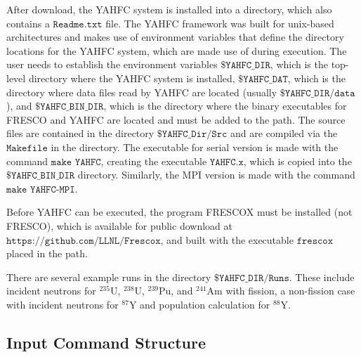 \documentclass[
10pt,
showpacs,preprintnumbers,footinbib,
amsfonts,amsmath,amssymb,
aps,
prc,twocolumn,groupedaddress,superscriptaddress,
showkeys,
nofootinbib
]{revtex4-1}
\begin{document}
After download, the YAHFC system is installed into a directory, which also contains a ${\texttt{Readme.txt}}$ file.
The YAHFC framework was built for unix-based architectures and makes use of environment variables that define the directory locations for the YAHFC system, which are made use of during execution. The user needs to establish the environment variables ${\texttt{\$YAHFC\_DIR}}$, which is the top-level directory where the YAHFC system is installed, ${\texttt{\$YAHFC\_DAT}}$, which is the directory where data files read by YAHFC are located (usually ${\texttt{\$YAHFC\_DIR/data}}$), and ${\texttt{\$YAHFC\_BIN\_DIR}}$, which is the directory where the binary executables for FRESCO and YAHFC are located and must be added to the path. The source files are contained in the directory ${\texttt{\$YAHFC\_Dir/Src}}$ and are compiled via the ${\texttt{Makefile}}$ in the directory. The executable for serial version is made with the command ${\texttt{make YAHFC}}$, creating the executable ${\texttt{YAHFC.x}}$, which is copied into the ${\texttt{\$YAHFC\_BIN\_DIR}}$ directory. Similarly, the MPI version is made with the command ${\texttt{make YAHFC-MPI}}$.

Before YAHFC can be executed, the program FRESCOX must be installed (not FRESCO), which is available for public download at ${\texttt{https://github.com/LLNL/Frescox}}$, and built with the executable ${\texttt{frescox}}$ placed in the path.

There are several example runs in the directory ${\texttt{\$YAHFC\_DIR/Runs}}$. These include incident neutrons for $^{235}$U, $^{238}$U, $^{239}$Pu, and $^{241}$Am with fission, a non-fission case with incident neutrons for $^{87}$Y and population calculation for $^{88}$Y. 

\subsection{Input Command Structure}
\end{document}
